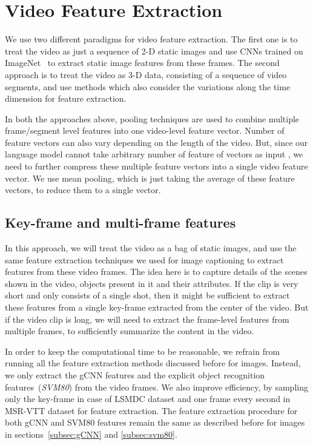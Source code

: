 \section{Video Feature Extraction}
\label{sec:VideoFeat}
We use two different paradigms for video feature extraction.
The first one is to treat the video as just a sequence of 2-D static images and
use CNNs trained on ImageNet~\cite{ImagenetOrig} to extract static image
features from these frames.
The second approach is to treat the video as 3-D data, consisting of a
sequence of video segments, and use methods which also consider the variations
along the time dimension for feature extraction.

In both the approaches above, pooling techniques are used to combine multiple
frame/segment level features into one video-level feature vector.
Number of feature vectors can also vary depending on the length of the video.
But, since our language model cannot take arbitrary number of feature of vectors
as input , we need to further compress these multiple feature vectors into a
single video feature vector. 
We use mean pooling, which is just taking the average of these feature vectors,
to reduce them to a single vector.

\subsection{Key-frame and multi-frame features}
In this approach, we will treat the video as a bag of static images, and use the
same feature extraction techniques we used for image captioning to extract
features from these video frames.
The idea here is to capture details of the scenes shown in the video, objects
present in it and their attributes.
If the clip is very short and only consists of a single shot, then it might be
sufficient to extract these features from a single key-frame extracted from the
center of the video. 
But if the video clip is long, we will need to extract the frame-level
features from multiple frames, to sufficiently summarize the content in the
video.

In order to keep the computational time to be reasonable, we refrain from
running all the feature extraction methods discussed before for images.
Instead, we only extract the gCNN features and the explicit object recognition
features~(\emph{SVM80}) from the video frames.
We also improve efficiency, by sampling only the key-frame in case of LSMDC
dataset and one frame every second in MSR-VTT dataset for feature extraction.
The feature extraction procedure for both gCNN and SVM80 features remain the
same as described before for images in sections~\ref{subsec:gCNN} and
\ref{subsec:svm80}. 

